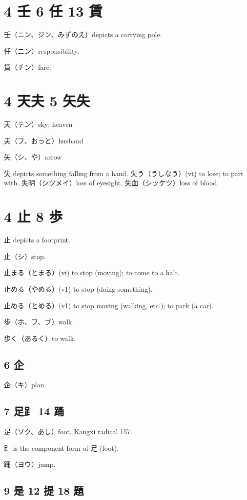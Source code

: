 \section{4 壬 6 任 13 賃}

壬（ニン、ジン、みずのえ）depicts a carrying pole.

任（ニン）responsibility.

賃（チン）fare.

\section{4 天夫 5 矢失}

天（テン）sky; heaven

夫（フ、おっと）husband

矢（シ、や）arrow

失 depicts something falling from a hand.
失う（うしなう）(vt) to lose; to part with.
失明（シツメイ）loss of eyesight.
失血（シッケツ）loss of blood.

\section{4 止 8 歩}

止 depicts a footprint.

止（シ）stop.

止まる（とまる）(vi) to stop (moving); to come to a halt.

止める（やめる）(v1) to stop (doing something).

止める（とめる）(v1) to stop moving (walking, etc.); to park (a car).

歩（ホ、フ、ブ）walk.

歩く（あるく）to walk.

\subsection{6 企}

企（キ）plan.

\subsection{7 足⻊ 14 踊}

足（ソク、あし）foot.
Kangxi radical 157.

⻊ is the component form of 足 (foot).

踊（ヨウ）jump.

\subsection{9 是 12 提 18 題}


